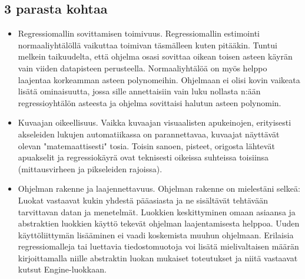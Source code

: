 \documentclass{article}
\begin{document}
	\subsection{3 parasta kohtaa}
	\begin{itemize}
		\item Regressiomallin sovittamisen toimivuus. Regressiomallin estimointi normaaliyhtälöllä
			  vaikuttaa toimivan täsmälleen kuten pitääkin. Tuntui melkein taikuudelta,
			  että ohjelma osasi sovittaa oikean toisen asteen käyrän vain viiden datapisteen 
			  perusteella. Normaaliyhtälöä on myös helppo laajentaa korkeamman asteen polynomeihin.
			  Ohjelmaan ei olisi kovin vaikeata lisätä ominaisuutta, jossa sille annettaisiin vain
			  luku nollasta n:ään regressioyhtälön asteesta ja ohjelma sovittaisi halutun asteen
			  polynomin.
		\item Kuvaajan oikeellisuus. Vaikka kuvaajan visuaalisten apukeinojen, erityisesti akseleiden
			  lukujen automatiikassa on parannettavaa, kuvaajat näyttävät olevan "matemaattisesti"
			  tosia. Toisin sanoen, pisteet, origosta lähtevät apuakselit ja regressiokäyrä ovat
			  teknisesti oikeissa suhteissa toisiinsa (mittausvirheen ja pikseleiden rajoissa). 
		 \item Ohjelman rakenne ja laajennettavuus. Ohjelman rakenne on mielestäni selkeä: Luokat vastaavat
                   kukin yhdestä pääasiasta ja ne sisältävät tehtävään tarvittavan datan ja menetelmät.
                   Luokkien keskittyminen omaan asiaansa ja abstraktien luokkien käyttö tekevät ohjelman
                   laajentamisesta helppoa. Uuden käyttöliittymän lisääminen ei vaadi koskemista
                   muuhun ohjelmaan. Erilaisia regressiomalleja tai luettavia tiedostomuotoja voi lisätä
                   mielivaltaisen määrän kirjoittamalla niille abstraktin luokan mukaiset toteutukset
                   ja niitä vastaavat kutsut Engine-luokkaan.
                  
	\end{itemize}
	
\end{document}
